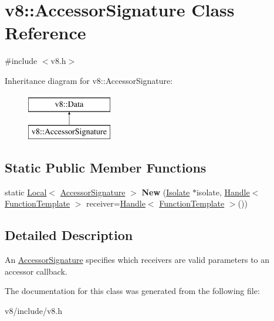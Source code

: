 \hypertarget{classv8_1_1AccessorSignature}{}\section{v8\+:\+:Accessor\+Signature Class Reference}
\label{classv8_1_1AccessorSignature}


{\ttfamily \#include $<$v8.\+h$>$}

Inheritance diagram for v8\+:\+:Accessor\+Signature\+:\begin{figure}[H]
\begin{center}
\leavevmode
\includegraphics[height=2.000000cm]{classv8_1_1AccessorSignature}
\end{center}
\end{figure}
\subsection*{Static Public Member Functions}
\begin{DoxyCompactItemize}
\item 
\hypertarget{classv8_1_1AccessorSignature_a608c489295009cf8c343c1099559b1cf}{}static \hyperlink{classv8_1_1Local}{Local}$<$ \hyperlink{classv8_1_1AccessorSignature}{Accessor\+Signature} $>$ {\bfseries New} (\hyperlink{classv8_1_1Isolate}{Isolate} $\ast$isolate, \hyperlink{classv8_1_1Handle}{Handle}$<$ \hyperlink{classv8_1_1FunctionTemplate}{Function\+Template} $>$ receiver=\hyperlink{classv8_1_1Handle}{Handle}$<$ \hyperlink{classv8_1_1FunctionTemplate}{Function\+Template} $>$())\label{classv8_1_1AccessorSignature_a608c489295009cf8c343c1099559b1cf}

\end{DoxyCompactItemize}


\subsection{Detailed Description}
An \hyperlink{classv8_1_1AccessorSignature}{Accessor\+Signature} specifies which receivers are valid parameters to an accessor callback. 

The documentation for this class was generated from the following file\+:\begin{DoxyCompactItemize}
\item 
v8/include/v8.\+h\end{DoxyCompactItemize}
